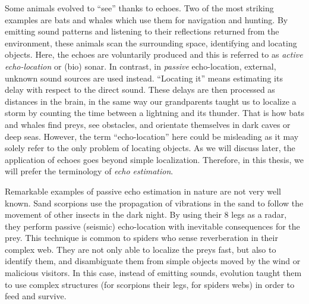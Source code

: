 \mynewline
Some animals evolved to ``see'' thanks to echoes.
Two of the most striking examples are bats and whales which use them for navigation and hunting.
By emitting sound patterns and listening to their reflections returned from the environment, these animals scan the surrounding space, identifying and locating objects.
Here, the echoes are voluntarily produced and this is referred to as \textit{active echo-location} or (bio) sonar.
In contrast, in \textit{passive} echo-location, external, unknown sound sources are used instead.
``Locating it'' means estimating its delay with respect to the direct sound.
These delays are then processed as distances in the brain, in the same way our grandparents taught us to localize a storm by counting the time between a lightning and its thunder.
That is how bats and whales find preys, see obstacles, and orientate themselves in dark caves or deep seas.
However, the term ``echo-location'' here could be misleading as it may solely refer to the only problem of locating objects.
As we will discuss later, the application of echoes goes beyond simple localization.
Therefore, in this thesis, we will prefer the terminology of \textit{echo estimation}.

\mynewline
Remarkable examples of passive echo estimation in nature are not very well known.
Sand scorpions use the propagation of vibrations in the sand to follow the movement of other insects in the dark night.
By using their 8 legs as a radar, they perform passive (seismic) echo-location with inevitable consequences for the prey.
This technique is common to spiders who sense reverberation in their complex web.
They are not only able to localize the preys fast, but also to identify them, and disambiguate them from simple objects moved by the wind or malicious visitors.
In this case, instead of emitting sounds, evolution taught them to use complex structures (for scorpions their legs, for spiders webs) in order to feed and survive.

